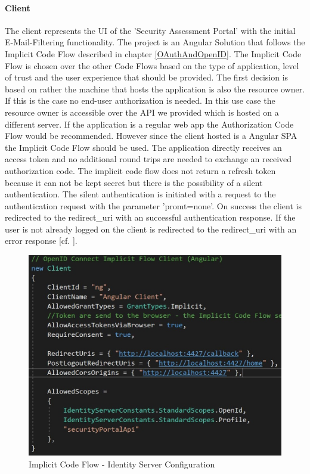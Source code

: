 \paragraph{Client}The client represents the UI of the 'Security Assessment Portal' with the initial E-Mail-Filtering functionality. The project is an Angular Solution that follows the Implicit Code Flow described in chapter \ref{OAuthAndOpenID}. The Implicit Code Flow is chosen over the other Code Flows based on the type of application, level of trust and the user experience that should be provided. The first decision is based on rather the machine that hosts the application is also the resource owner. If this is the case no end-user authorization is needed. In this use case the resource owner is accessible over the API we provided which is hosted on a different server. If the application is a regular web app the Authorization Code Flow would be recommended. However since the client hosted is a Angular SPA the Implicit Code Flow should be used. The application directly receives an access token and no additional round trips are needed to exchange an received authorization code. The implicit code flow does not return a refresh token because it can not be kept secret but there is the possibility of a silent authentication. The silent authentication is initiated with a request to the authentication request with the parameter 'promt=none'. On success the client is redirected to the redirect\_uri with an successful authentication response. If the user is not already logged on the client is redirected to the redirect\_uri with an error response [cf. \cite{OAuth:2018:Flow}].  

\begin{figure}[h]
	\centering
	\includegraphics[width=0.8\linewidth]{images/implicit_code_flow}
	\caption{Implicit Code Flow - Identity Server Configuration}
	\label{fig:implicitcodeflow}
\end{figure}

